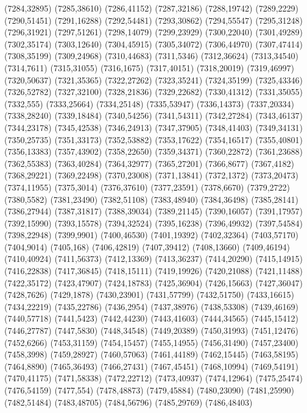 (7284,32895)
(7285,38610)
(7286,41152)
(7287,32186)
(7288,19742)
(7289,2229)
(7290,51451)
(7291,16288)
(7292,54481)
(7293,30862)
(7294,55547)
(7295,31248)
(7296,31921)
(7297,51261)
(7298,14079)
(7299,23929)
(7300,22040)
(7301,49289)
(7302,35174)
(7303,12640)
(7304,45915)
(7305,34072)
(7306,44970)
(7307,47414)
(7308,35199)
(7309,24968)
(7310,44683)
(7311,5346)
(7312,36624)
(7313,34540)
(7314,7611)
(7315,31055)
(7316,1675)
(7317,40151)
(7318,20019)
(7319,46997)
(7320,50637)
(7321,35365)
(7322,27262)
(7323,35241)
(7324,35199)
(7325,43346)
(7326,52782)
(7327,32100)
(7328,21836)
(7329,22682)
(7330,41312)
(7331,35055)
(7332,555)
(7333,25664)
(7334,25148)
(7335,53947)
(7336,14373)
(7337,20334)
(7338,28240)
(7339,18484)
(7340,54256)
(7341,54311)
(7342,27284)
(7343,46137)
(7344,23178)
(7345,42538)
(7346,24913)
(7347,37905)
(7348,41403)
(7349,34131)
(7350,25735)
(7351,33173)
(7352,53882)
(7353,17622)
(7354,16517)
(7355,40801)
(7356,13383)
(7357,43902)
(7358,22650)
(7359,34371)
(7360,22872)
(7361,23688)
(7362,55383)
(7363,40284)
(7364,32977)
(7365,27201)
(7366,8677)
(7367,4182)
(7368,29221)
(7369,22498)
(7370,23008)
(7371,13841)
(7372,1372)
(7373,20473)
(7374,11955)
(7375,3014)
(7376,37610)
(7377,23591)
(7378,6670)
(7379,2722)
(7380,5582)
(7381,23490)
(7382,51108)
(7383,48940)
(7384,36498)
(7385,28141)
(7386,27944)
(7387,31817)
(7388,39034)
(7389,21145)
(7390,16057)
(7391,17957)
(7392,15990)
(7393,15578)
(7394,32524)
(7395,16238)
(7396,49932)
(7397,54584)
(7398,22948)
(7399,9901)
(7400,46530)
(7401,19392)
(7402,32364)
(7403,57170)
(7404,9014)
(7405,168)
(7406,42819)
(7407,39412)
(7408,13660)
(7409,46194)
(7410,40924)
(7411,56373)
(7412,13369)
(7413,36237)
(7414,20290)
(7415,14915)
(7416,22838)
(7417,36845)
(7418,15111)
(7419,19926)
(7420,21088)
(7421,11488)
(7422,35172)
(7423,47907)
(7424,18783)
(7425,36904)
(7426,15663)
(7427,36047)
(7428,7626)
(7429,1878)
(7430,23901)
(7431,57799)
(7432,51750)
(7433,16615)
(7434,22219)
(7435,22786)
(7436,2954)
(7437,38976)
(7438,53308)
(7439,46169)
(7440,57718)
(7441,5423)
(7442,44230)
(7443,41603)
(7444,34565)
(7445,15412)
(7446,27787)
(7447,5830)
(7448,34548)
(7449,20389)
(7450,31993)
(7451,12476)
(7452,6266)
(7453,31159)
(7454,15457)
(7455,14955)
(7456,31490)
(7457,23400)
(7458,3998)
(7459,28927)
(7460,57063)
(7461,44189)
(7462,15445)
(7463,58195)
(7464,8890)
(7465,36493)
(7466,27431)
(7467,45451)
(7468,10994)
(7469,54191)
(7470,41175)
(7471,58338)
(7472,22712)
(7473,40937)
(7474,12964)
(7475,25474)
(7476,54159)
(7477,554)
(7478,48873)
(7479,45884)
(7480,23090)
(7481,25990)
(7482,51484)
(7483,48705)
(7484,56796)
(7485,29769)
(7486,48403)
